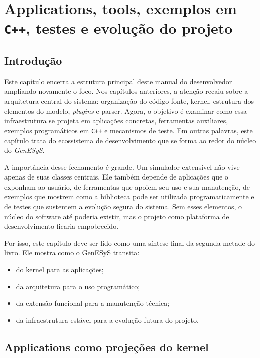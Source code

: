 \chapter{Applications, tools, exemplos em \texttt{C++}, testes e evolução do projeto}
\label{chap:applications_tools_exemplos_testes_evolucao}

\section{Introdução}
\label{sec:cap10_introducao}

Este capítulo encerra a estrutura principal deste manual do desenvolvedor ampliando novamente o foco. Nos capítulos anteriores, a atenção recaiu sobre a arquitetura central do sistema: organização do código-fonte, kernel, estrutura dos elementos do modelo, \textit{plugins} e parser. Agora, o objetivo é examinar como essa infraestrutura se projeta em aplicações concretas, ferramentas auxiliares, exemplos programáticos em \texttt{C++} e mecanismos de teste. Em outras palavras, este capítulo trata do ecossistema de desenvolvimento que se forma ao redor do núcleo do \textit{GenESyS}.

A importância desse fechamento é grande. Um simulador extensível não vive apenas de suas classes centrais. Ele também depende de aplicações que o exponham ao usuário, de ferramentas que apoiem seu uso e sua manutenção, de exemplos que mostrem como a biblioteca pode ser utilizada programaticamente e de testes que sustentem a evolução segura do sistema. Sem esses elementos, o núcleo do software até poderia existir, mas o projeto como plataforma de desenvolvimento ficaria empobrecido.

Por isso, este capítulo deve ser lido como uma síntese final da segunda metade do livro. Ele mostra como o GenESyS transita:
\begin{itemize}
    \item do kernel para as aplicações;
    \item da arquitetura para o uso programático;
    \item da extensão funcional para a manutenção técnica;
    \item da infraestrutura estável para a evolução futura do projeto.
\end{itemize}

\section{Applications como projeções do kernel}
\label{sec:cap10_applications_como_projecoes_kernel}

